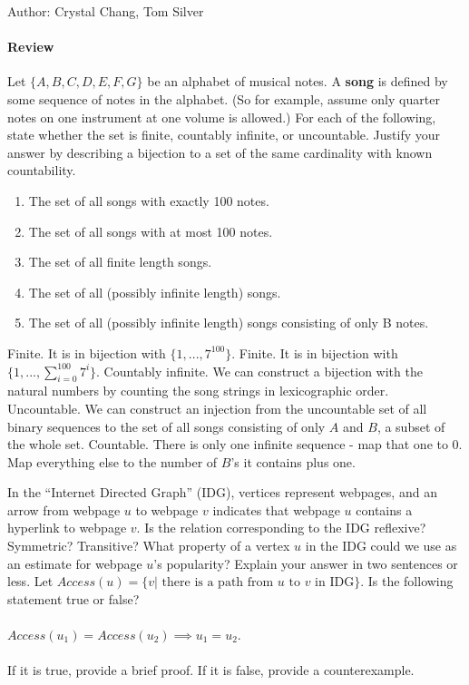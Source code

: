 \documentclass[solution, letterpaper]{cs20inclass}
\begin{document}

\noindent Author: Crystal Chang, Tom Silver%

\paragraph*{Review}

\problem
Let $\{A, B, C, D, E, F, G\}$ be an alphabet of musical notes. A \textbf{song} is defined by some sequence of notes in the alphabet. (So for example, assume only quarter notes on one instrument at one volume is allowed.) For each of the following, state whether the set is finite, countably infinite, or uncountable. Justify your answer by describing a bijection to a set of the same cardinality with known countability.

\begin{enumerate}

\item The set of all songs with exactly 100 notes.
\item The set of all songs with at most 100 notes.
\item The set of all finite length songs.
\item The set of all (possibly infinite length) songs.
\item The set of all (possibly infinite length) songs consisting of only B notes.

\end{enumerate}

\begin{solution}

\subsolution Finite. It is in bijection with $\{1, ..., 7^{100} \}$. 
\subsolution Finite. It is in bijection with $\{1, ..., \sum_{i=0}^{100} 7^{i} \}$.
\subsolution Countably infinite. We can construct a bijection with the natural numbers by counting the song strings in lexicographic order.
\subsolution Uncountable. We can construct an injection from the uncountable set of all binary sequences to the set of all songs consisting of only $A$ and $B$, a subset of the whole set.
\subsolution Countable. There is only one infinite sequence - map that one to 0. Map everything else to the number of $B$'s it contains plus one.

\end{solution}

\problem
In the ``Internet Directed Graph'' (IDG), vertices represent webpages, and an arrow from webpage $u$ to webpage $v$ indicates that webpage $u$ contains a hyperlink to webpage $v$. 
\subproblem Is the relation corresponding to the IDG reflexive? Symmetric? Transitive? 
\subproblem What property of a vertex $u$ in the IDG could we use as an estimate for webpage $u$'s popularity? Explain your answer in two sentences or less.
\subproblem Let $Access(u) = \{ v | \text{ there is a path from } u \text{ to } v \text{ in IDG}\}$. Is the following statement true or false? 
\\
\\$Access(u_1) = Access(u_2) \implies u_1 = u_2$. 
\\
\\ If it is true, provide a brief proof. If it is false, provide a counterexample.
\end{document}
